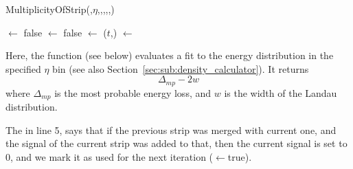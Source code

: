 \documentclass[11pt]{article}
\newcommand{\secref}[1]{Section~\ref{#1}}
\begin{document}
\begin{function}[htbp]
  \caption{MultiplicityOfStrip(,$\eta$,,,,,)} 
  \label{func:MultiplicityOfStrip}
   {
    \usedThis $\leftarrow$ false\;
    \usedPrev $\leftarrow$ false\;
  }
  \highCut $\leftarrow$ \GetHighCut($t$,\Eta)\;
  \total $\leftarrow$ \Current\;
\end{function}
Here, the function  (see below) evaluates a fit to the energy
distribution in the specified $\eta$ bin (see also
\secref{sec:sub:density_calculator}).  It returns
$$
\Delta_{mp} - 2 w
$$
where $\Delta_{mp}$ is the most probable energy loss, and $w$ is the
width of the Landau distribution.  

The  in line 5, says that if the previous strip was merged
with current one, and the signal of the current strip was added to
that, then the current signal is set to 0, and we mark it as used for
the next iteration ($\leftarrow$true).

\end{document}
